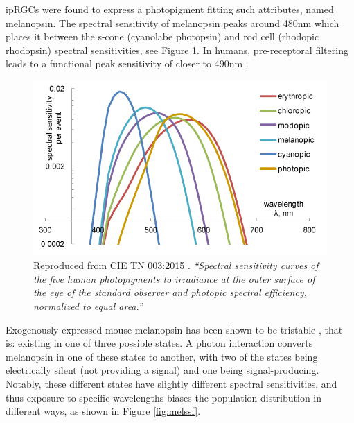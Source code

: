 \Glspl{ipRGC} were found to express a photopigment fitting such attributes, named melanopsin. The spectral sensitivity of melanopsin peaks around 480nm \citep{qiu_induction_2005,hankins_primary_2002,dacey_melanopsin-expressing_2005,peirson_melanopsin_2006,bailes_human_2013} which places it between the s-cone (cyanolabe photopsin) and rod cell (rhodopic rhodopsin) spectral sensitivities, see Figure \ref{fig:specsens}. In humans, pre-receptoral filtering leads to a functional peak sensitivity of closer to 490nm \citep{cie_cie_2015-1}. 

\begin{figure}[htbp]
\includegraphics[max width=\textwidth, center]{figs/LitRev/ciemel.png}
\caption{Reproduced from \gls{CIE} TN 003:2015 \citep{cie_cie_2015-1}. \textit{``Spectral sensitivity curves of the five human photopigments to irradiance at the outer surface of the eye of the standard observer and photopic spectral efficiency, normalized to equal area.''}}
\label{fig:specsens}
\end{figure}

Exogenously expressed mouse melanopsin has been shown to be tristable \citep{emanuel_melanopsin_2015,matsuyama_photochemical_2012-1}, that is: existing in one of three possible states. A photon interaction converts melanopsin in one of these states to another, with two of the states being electrically silent (not providing a signal) and one being signal-producing. Notably, these different states have slightly different spectral sensitivities, and thus exposure to specific wavelengths biases the population distribution in different ways, as shown in Figure \ref{fig:melssf}.


